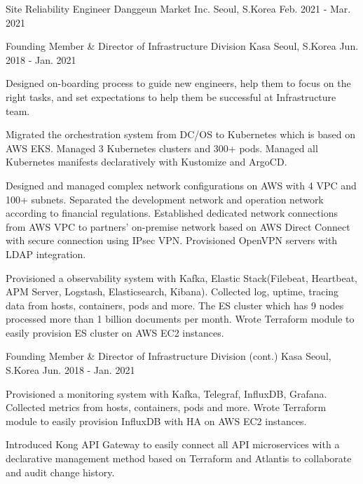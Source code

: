 \begin{cventries}
  \cventry
    {Site Reliability Engineer} %
    {Danggeun Market Inc.} %
    {Seoul, S.Korea} %
    {Feb. 2021 - Mar. 2021} %
    {
    }

  \cventry
    {Founding Member \& Director of Infrastructure Division} %
    {Kasa} %
    {Seoul, S.Korea} %
    {Jun. 2018 - Jan. 2021} %
    {
      \begin{cvitems} %
        \item {Designed on-boarding process to guide new engineers, help them to focus on the right tasks, and set expectations to help them be successful at Infrastructure team.}
        \item {Migrated the orchestration system from DC/OS to Kubernetes which is based on AWS EKS. Managed 3 Kubernetes clusters and 300+ pods. Managed all Kubernetes manifests declaratively with Kustomize and ArgoCD.}
        \item {Designed and managed complex network configurations on AWS with 4 VPC and 100+ subnets. Separated the development network and operation network according to financial regulations. Established dedicated network connections from AWS VPC to partners' on-premise network based on AWS Direct Connect with secure connection using IPsec VPN. Provisioned OpenVPN servers with LDAP integration.}
        \item {Provisioned a observability system with Kafka, Elastic Stack(Filebeat, Heartbeat, APM Server, Logstash, Elasticsearch, Kibana). Collected log, uptime, tracing data from hosts, containers, pods and more. The ES cluster which has 9 nodes processed more than 1 billion documents per month. Wrote Terraform module to easily provision ES cluster on AWS EC2 instances.}
    \end{cvitems}
    }
    \newpage
  \cventry
    {Founding Member \& Director of Infrastructure Division (cont.)} %
    {Kasa} %
    {Seoul, S.Korea} %
    {Jun. 2018 - Jan. 2021} %
    {
    \begin{cvitems}
        \item {Provisioned a monitoring system with Kafka, Telegraf, InfluxDB, Grafana. Collected metrics from hosts, containers, pods and more. Wrote Terraform module to easily provision InfluxDB with HA on AWS EC2 instances.}
        \item {Introduced Kong API Gateway to easily connect all API microservices with a declarative management method based on Terraform and Atlantis to collaborate and audit change history.}

\end{cvitems}}
\end{cventries}
